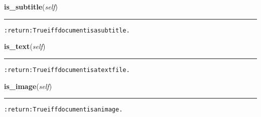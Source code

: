     \vspace{0.5ex}

\hspace{.8\funcindent}\begin{boxedminipage}{\funcwidth}

    \raggedright \textbf{is\_subtitle}(\textit{self})

    \vspace{-1.5ex}

    \rule{\textwidth}{0.5\fboxrule}
\setlength{\parskip}{2ex}
\begin{alltt}

:return: True iff document is a subtitle.
\end{alltt}

\setlength{\parskip}{1ex}
    \end{boxedminipage}

    \label{hal:files:models:Document:is_text}

    \vspace{0.5ex}

\hspace{.8\funcindent}\begin{boxedminipage}{\funcwidth}

    \raggedright \textbf{is\_text}(\textit{self})

    \vspace{-1.5ex}

    \rule{\textwidth}{0.5\fboxrule}
\setlength{\parskip}{2ex}
\begin{alltt}

:return: True iff document is a text file.
\end{alltt}

\setlength{\parskip}{1ex}
    \end{boxedminipage}

    \label{hal:files:models:Document:is_image}

    \vspace{0.5ex}

\hspace{.8\funcindent}\begin{boxedminipage}{\funcwidth}

    \raggedright \textbf{is\_image}(\textit{self})

    \vspace{-1.5ex}

    \rule{\textwidth}{0.5\fboxrule}
\setlength{\parskip}{2ex}
\begin{alltt}

:return: True iff document is an image.
\end{alltt}

\setlength{\parskip}{1ex}
    \end{boxedminipage}

